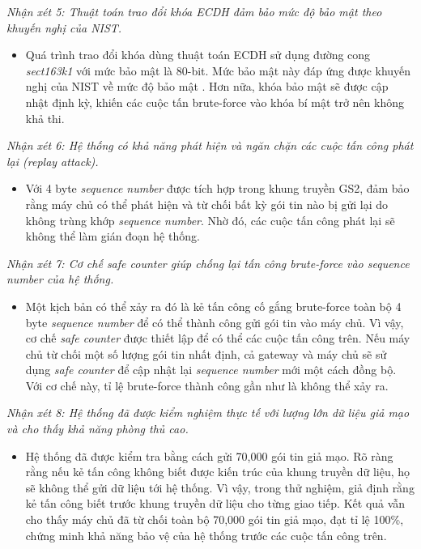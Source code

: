 \textit{Nhận xét 5: Thuật toán trao đổi khóa ECDH đảm bảo mức độ bảo mật theo khuyến nghị của NIST.}
\begin{itemize}
    \item Quá trình trao đổi khóa dùng thuật toán ECDH sử dụng đường cong \textit{sect163k1} với mức bảo mật là 80-bit. Mức bảo mật này đáp ứng được khuyến nghị của NIST về mức độ bảo mật \cite{nist}. Hơn nữa, khóa bảo mật sẽ được cập nhật định kỳ, khiến các cuộc tấn brute-force vào khóa bí mật trở nên không khả thi.
\end{itemize}

\textit{Nhận xét 6: Hệ thống có khả năng phát hiện và ngăn chặn các cuộc tấn công phát lại (replay attack).}
\begin{itemize}
    \item Với 4 byte \textit{sequence number} được tích hợp trong khung truyền GS2, đảm bảo rằng máy chủ có thể phát hiện và từ chối bất kỳ gói tin nào bị gửi lại do không trùng khớp \textit{sequence number}. Nhờ đó, các cuộc tấn công phát lại sẽ không thể làm gián đoạn hệ thống.
\end{itemize}

\textit{Nhận xét 7: Cơ chế safe counter giúp chống lại tấn công brute-force vào sequence number của hệ thống.}
\begin{itemize}
    \item Một kịch bản có thể xảy ra đó là kẻ tấn công cố gắng brute-force toàn bộ 4 byte \textit{sequence number} để có thể thành công gửi gói tin vào máy chủ. Vì vậy, cơ chế \textit{safe counter} được thiết lập để có thể các cuộc tấn công trên. Nếu máy chủ từ chối một số lượng gói tin nhất định, cả gateway và máy chủ sẽ sử dụng \textit{safe counter} để cập nhật lại \textit{sequence number} mới một cách đồng bộ. Với cơ chế này, tỉ lệ brute-force thành công gần như là không thể xảy ra. 
\end{itemize}

\textit{Nhận xét 8: Hệ thống đã được kiểm nghiệm thực tế với lượng lớn dữ liệu giả mạo và cho thấy khả năng phòng thủ cao.}
\begin{itemize}
    \item Hệ thống đã được kiểm tra bằng cách gửi 70,000 gói tin giả mạo. Rõ ràng rằng nếu kẻ tấn công không biết được kiến trúc của khung truyền dữ liệu, họ sẽ không thể gửi dữ liệu tới hệ thống. Vì vậy, trong thử nghiệm, giả định rằng kẻ tấn công biết trước khung truyền dữ liệu cho từng giao tiếp. Kết quả vẫn cho thấy máy chủ đã từ chối toàn bộ 70,000 gói tin giả mạo, đạt tỉ lệ 100\%, chứng minh khả năng bảo vệ của hệ thống trước các cuộc tấn công trên.
\end{itemize}

